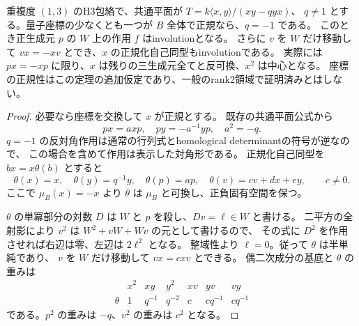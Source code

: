 \begin{theorem}
\label{thm:h3-order2-normal-quantum-axis}
重複度 $(1,3)$ のH3包絡で、共通平面が $T=k\langle x,y\rangle/(xy-qyx)$、
$q\ne1$ とする。量子座標の少なくとも一つが $B$ 全体で正規なら、$q=-1$ である。
このとき正生成元 $p$ の $W$ 上の作用 $f$ はinvolutionとなる。
さらに $v$ を $W$ だけ移動して $vx=-xv$ とでき、$x$ の正規化自己同型もinvolutionである。
実際には $px=-xp$ に限り、$x$ は残りの三生成元全てと反可換、$x^2$ は中心となる。
座標の正規性はこの定理の追加仮定であり、一般のrank2領域で証明済みとはしない。
\end{theorem}
\begin{proof}
必要なら座標を交換して $x$ が正規とする。
既存の共通平面公式から
\[
 px=a xp,\quad py=-a^{-1}yp,\quad a^2=-q.
\]
$q=-1$ の反対角作用は通常の行列式とhomological determinantの符号が逆なので、
この場合を含めて作用は表示した対角形である。
正規化自己同型を $bx=x\theta(b)$ とすると
\[
 \theta(x)=x,\quad\theta(y)=q^{-1}y,\quad\theta(p)=ap,\quad
 \theta(v)=cv+dx+ey,\qquad c\ne0.
\]
ここで $\mu_B(x)=-x$ より $\theta$ は $\mu_B$ と可換し、正負固有空間を保つ。

$\theta$ の単冪部分の対数 $D$ は $W$ と $p$ を殺し、$Dv=\ell\in W$ と書ける。
二平方の全射影により $v^2$ は $W^2+vW+Wv$ の元として書けるので、
その式に $D^2$ を作用させれば右辺は零、左辺は $2\ell^2$ となる。
整域性より $\ell=0$。従って $\theta$ は半単純であり、
$v$ を $W$ だけ移動して $vx=cxv$ とできる。
偶二次成分の基底と $\theta$ の重みは
\[
\begin{array}{c|cccccc}
 &x^2&xy&y^2&xv&yv&vy\\\hline
 \theta&1&q^{-1}&q^{-2}&c&cq^{-1}&cq^{-1}
\end{array}
\]
である。$p^2$ の重みは $-q$、$v^2$ の重みは $c^2$ となる。


\end{proof}

